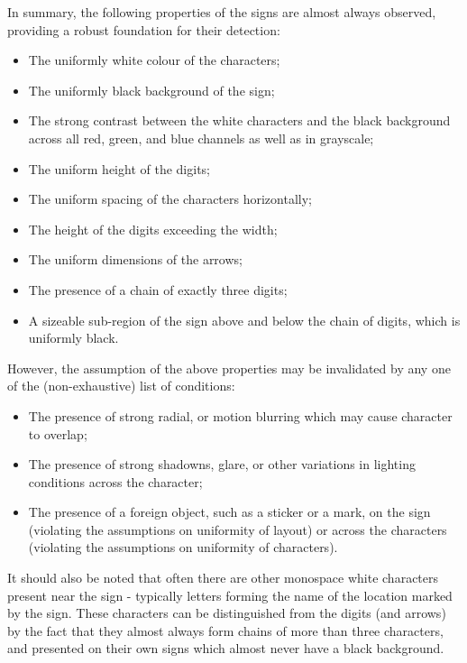 \documentclass{article}
\begin{document}
In summary, the following properties of the signs are almost always observed,
providing a robust foundation for their detection:
\begin{itemize}
\item
  The uniformly white colour of the characters;

\item
  The uniformly black background of the sign;

\item
  The strong contrast between the white characters and the black background
  across all red, green, and blue channels as well as in grayscale;

\item
  The uniform height of the digits;

\item
  The uniform spacing of the characters horizontally;

\item
  The height of the digits exceeding the width;

\item
  The uniform dimensions of the arrows;

\item
  The presence of a chain of exactly three digits;

\item
  A sizeable sub-region of the sign above and below the chain of digits, which
  is uniformly black.
\end{itemize}
However, the assumption of the above properties may be invalidated by any one of
the (non-exhaustive) list of conditions:
\begin{itemize}
\item
  The presence of strong radial, or motion blurring which may cause character to
  overlap;

\item
  The presence of strong shadowns, glare, or other variations in lighting
  conditions across the character;

\item
  The presence of a foreign object, such as a sticker or a mark, on the sign
  (violating the assumptions on uniformity of layout) or across the characters
  (violating the assumptions on uniformity of characters).

\end{itemize}
It should also be noted that often there are other monospace white characters
present near the sign - typically letters forming the name of the location
marked by the sign.
These characters can be distinguished from the digits (and arrows) by the fact
that they almost always form chains of more than three characters, and presented
on their own signs which almost never have a black background.
\end{document}
